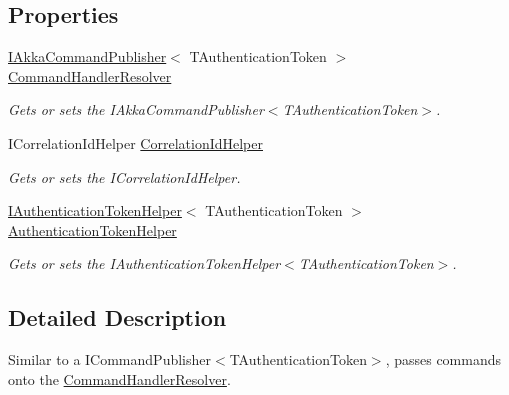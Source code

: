 \subsection*{Properties}
\begin{DoxyCompactItemize}
\item 
\hyperlink{interfaceCqrs_1_1Akka_1_1Commands_1_1IAkkaCommandPublisher}{I\+Akka\+Command\+Publisher}$<$ T\+Authentication\+Token $>$ \hyperlink{classCqrs_1_1Akka_1_1Commands_1_1AkkaCommandBusProxy_1_1BusActor_a097e43f25d55e632c2c5da9d0255d180_a097e43f25d55e632c2c5da9d0255d180}{Command\+Handler\+Resolver}
\begin{DoxyCompactList}\small\item\em Gets or sets the I\+Akka\+Command\+Publisher$<$\+T\+Authentication\+Token$>$. \end{DoxyCompactList}\item 
I\+Correlation\+Id\+Helper \hyperlink{classCqrs_1_1Akka_1_1Commands_1_1AkkaCommandBusProxy_1_1BusActor_ab353a9b434004f9b0637dd5dbe4402ac_ab353a9b434004f9b0637dd5dbe4402ac}{Correlation\+Id\+Helper}
\begin{DoxyCompactList}\small\item\em Gets or sets the I\+Correlation\+Id\+Helper. \end{DoxyCompactList}\item 
\hyperlink{interfaceCqrs_1_1Authentication_1_1IAuthenticationTokenHelper}{I\+Authentication\+Token\+Helper}$<$ T\+Authentication\+Token $>$ \hyperlink{classCqrs_1_1Akka_1_1Commands_1_1AkkaCommandBusProxy_1_1BusActor_a10dd32ee768f6ccf93aa0e04472c84b6_a10dd32ee768f6ccf93aa0e04472c84b6}{Authentication\+Token\+Helper}
\begin{DoxyCompactList}\small\item\em Gets or sets the I\+Authentication\+Token\+Helper$<$\+T\+Authentication\+Token$>$. \end{DoxyCompactList}\end{DoxyCompactItemize}


\subsection{Detailed Description}
Similar to a I\+Command\+Publisher$<$\+T\+Authentication\+Token$>$, passes commands onto the \hyperlink{classCqrs_1_1Akka_1_1Commands_1_1AkkaCommandBusProxy_1_1BusActor_a097e43f25d55e632c2c5da9d0255d180_a097e43f25d55e632c2c5da9d0255d180}{Command\+Handler\+Resolver}. 



